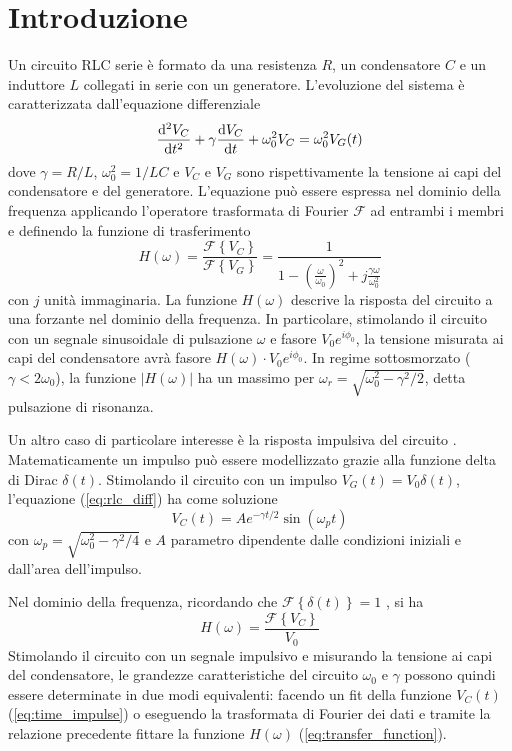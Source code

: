 \documentclass[12pt,a4paper, twocolumn]{article}
\newcommand{\fourier}[1]{\mathcal{F}\left\{#1\right\}}
\begin{document}
\section{Introduzione}
Un circuito RLC serie è formato da una resistenza $R$, un condensatore $C$ e un induttore $L$ collegati in serie con un generatore. L'evoluzione del sistema è caratterizzata dall'equazione differenziale
\begin{equation}
\dv[2]{V_C}{t} + \gamma \dv{V_C}{t} + \omega_0^2 V_C = \omega_0^2 V_G(t)
\label{eq:rlc_diff}
\end{equation}
dove $\gamma = R/L$, $\omega_0^2 = 1/LC$ e $V_C$ e $V_G$ sono rispettivamente la tensione ai capi del condensatore e del generatore. L'equazione può essere espressa nel dominio della frequenza applicando l'operatore trasformata di Fourier $\mathcal{F}$ ad entrambi i membri e definendo la funzione di trasferimento
\begin{equation}
H(\omega) = \frac{\fourier{V_C}}{\fourier{V_G}} = \frac{1}{1 - \left(\frac{\omega}{\omega_0}\right)^2 + j \frac{\gamma \omega}{\omega_0^2}}
\label{eq:transfer_function}
\end{equation}
con $j$ unità immaginaria. La funzione $H(\omega)$ descrive la risposta del circuito a una forzante nel dominio della frequenza. In particolare, stimolando il circuito con un segnale sinusoidale di pulsazione $\omega$ e fasore $V_0 e^{i\phi_0}$, la tensione misurata ai capi del condensatore avrà fasore $H(\omega) \cdot V_0 e^{i\phi_0}$. In regime sottosmorzato ($\gamma < 2\omega_0$), la funzione $\left|H(\omega)\right|$ ha un massimo per $\omega_r = \sqrt{\omega_0^2 - \gamma^2 / 2}$, detta pulsazione di risonanza.

Un altro caso di particolare interesse è la risposta impulsiva del circuito \cite{cafarelli2012rlc}. Matematicamente un impulso può essere modellizzato grazie alla funzione delta di Dirac $\delta(t)$. Stimolando il circuito con un impulso $V_G(t) = V_0 \delta(t)$, l'equazione (\ref{eq:rlc_diff}) ha come soluzione
\begin{equation}
V_C(t) = Ae^{- \gamma t / 2}\sin{(\omega_p t)}
\label{eq:time_impulse}
\end{equation}
con $\omega_p = \sqrt{\omega_0^2 - \gamma^2 / 4}$ e $A$ parametro dipendente dalle condizioni iniziali e dall'area dell'impulso.

Nel dominio della frequenza, ricordando che $\fourier{\delta(t)} = 1$ \cite{fourier}, si ha 
\begin{equation}
H(\omega) = \frac{\fourier{V_C}}{V_0}
\label{eq:freqs_impulse}
\end{equation}
Stimolando il circuito con un segnale impulsivo e misurando la tensione ai capi del condensatore, le grandezze caratteristiche del circuito $\omega_0$ e $\gamma$ possono quindi essere determinate in due modi equivalenti: facendo un fit della funzione $V_C(t)$ (\ref{eq:time_impulse}) o eseguendo la trasformata di Fourier dei dati e tramite la relazione precedente fittare la funzione $H(\omega)$ (\ref{eq:transfer_function}).
\end{document}
